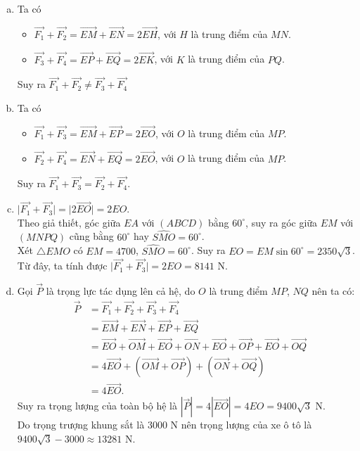 \begin{ex}
{\begin{center}
		\end{center}
		\begin{enumerate}[a)]
			\item Ta có
			\begin{itemize}
				\item [$\bullet$] $\vec{F_1}+\vec{F_2}=\vec{EM}+\vec{EN}=2\vec{EH}$, với $H$ là trung điểm của $MN$.
				\item [$\bullet$] $\vec{F_3}+\vec{F_4}=\vec{EP}+\vec{EQ}=2\vec{EK}$, với $K$ là trung điểm của $PQ$.
			\end{itemize}
			Suy ra $\vec{F_1}+\vec{F_2}\ne \vec{F_3}+\vec{F_4}$
			\item Ta có
			\begin{itemize}
				\item [$\bullet$] $\vec{F_1}+\vec{F_3}=\vec{EM}+\vec{EP}=2\vec{EO}$, với $O$ là trung điểm của $MP$.
				\item [$\bullet$] $\vec{F_2}+\vec{F_4}=\vec{EN}+\vec{EQ}=2\vec{EO}$, với $O$ là trung điểm của $MP$.
			\end{itemize}
			Suy ra $\vec{F_1}+\vec{F_3}=\vec{F_2}+\vec{F_4}$.
			\item $\big|\vec{F_1}+\vec{F_3}\big|=\big|2\vec{EO}\big|=2EO$.\\
			Theo giả thiết, góc giữa $EA$ với $(ABCD)$ bằng $60^\circ$, suy ra góc giữa $EM$ với $(MNPQ)$ cũng bằng $60^\circ$ hay $\widehat{SMO}=60^\circ$.\\
			Xét $\triangle EMO$ có $EM=4700$, $\widehat{SMO}=60^\circ$. Suy ra $EO = EM \sin 60^\circ = 2350\sqrt{3}$.\\
			Từ đây, ta tính được $\big|\vec{F_1}+\vec{F_3}\big|=2EO=8141$ N.
			\item Gọi $\vec{P}$ là trọng lực tác dụng lên cả hệ, do $O$ là trung điểm $MP$, $NQ$ nên ta có:
			\begin{eqnarray*}
				& \vec{P} & = \vec{F_1}+\vec{F_2}+\vec{F_3}+\vec{F_4}\\
				& & = \vec{EM } + \vec{EN} + \vec{EP} + \vec{EQ}\\
				& & = \vec{EO} + \vec{OM} + \vec{EO} + \vec{ON} + \vec{EO} + \vec{OP} + \vec{EO} + \vec{OQ}\\
				& & = 4\vec{EO} + \left(\vec{OM} + \vec{OP}\right) + \left(\vec{ON} + \vec{OQ}\right)\\
				& & = 4\vec{EO}. 
			\end{eqnarray*} 
			Suy ra trọng lượng của toàn bộ hệ là $\left| \vec{P} \right| = 4\left| \vec{EO}\right| = 4EO = 9400\sqrt{3}$ N.\\
			Do trọng trượng khung sắt là $3000$ N nên trọng lượng của xe ô tô là $9400\sqrt{3} - 3000 \approx 13281$ N.
		\end{enumerate}
	}
\end{ex} 



